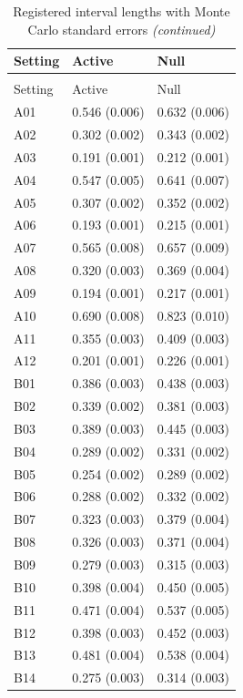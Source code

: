 
\begin{longtable}[t]{lll}
\caption{\label{tab:registered-joint-length}Registered interval lengths with Monte Carlo standard errors}\\
\toprule
Setting & Active & Null\\
\midrule
\endfirsthead
\caption[]{Registered interval lengths with Monte Carlo standard errors \textit{(continued)}}\\
\toprule
Setting & Active & Null\\
\midrule
\endhead

\endfoot
\bottomrule
\endlastfoot
A01 & 0.546 (0.006) & 0.632 (0.006)\\
A02 & 0.302 (0.002) & 0.343 (0.002)\\
A03 & 0.191 (0.001) & 0.212 (0.001)\\
A04 & 0.547 (0.005) & 0.641 (0.007)\\
A05 & 0.307 (0.002) & 0.352 (0.002)\\
A06 & 0.193 (0.001) & 0.215 (0.001)\\
A07 & 0.565 (0.008) & 0.657 (0.009)\\
A08 & 0.320 (0.003) & 0.369 (0.004)\\
A09 & 0.194 (0.001) & 0.217 (0.001)\\
A10 & 0.690 (0.008) & 0.823 (0.010)\\
A11 & 0.355 (0.003) & 0.409 (0.003)\\
A12 & 0.201 (0.001) & 0.226 (0.001)\\
B01 & 0.386 (0.003) & 0.438 (0.003)\\
B02 & 0.339 (0.002) & 0.381 (0.003)\\
B03 & 0.389 (0.003) & 0.445 (0.003)\\
B04 & 0.289 (0.002) & 0.331 (0.002)\\
B05 & 0.254 (0.002) & 0.289 (0.002)\\
B06 & 0.288 (0.002) & 0.332 (0.002)\\
B07 & 0.323 (0.003) & 0.379 (0.004)\\
B08 & 0.326 (0.003) & 0.371 (0.004)\\
B09 & 0.279 (0.003) & 0.315 (0.003)\\
B10 & 0.398 (0.004) & 0.450 (0.005)\\
B11 & 0.471 (0.004) & 0.537 (0.005)\\
B12 & 0.398 (0.003) & 0.452 (0.003)\\
B13 & 0.481 (0.004) & 0.538 (0.004)\\
B14 & 0.275 (0.003) & 0.314 (0.003)\\

\end{longtable}
